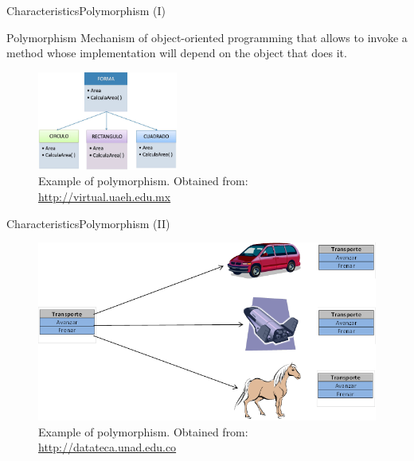 \documentclass[10pt,compress]{beamer} %
\begin{document}
\begin{frame}{Characteristics}{Polymorphism (I)}
\vspace{-0.2cm}
	\begin{block}{Polymorphism}
		Mechanism of object-oriented programming that allows to invoke a method whose implementation will depend on the object that does it.
  	\end{block}	
	\begin{figure}
	  \vspace{-0.2cm}
		\includegraphics[width=4.6cm]{figs/polimorfismo1}
		\vspace{-0.2cm}
		\caption{\scriptsize{Example of polymorphism. Obtained from: \url{http://virtual.uaeh.edu.mx}}}
	\end{figure}
\end{frame}

\begin{frame}{Characteristics}{Polymorphism (II)}
	\begin{figure}
		\includegraphics[scale=0.57]{figs/polimorfismo2}
		\vspace{-0.1cm}
		\caption{{\scriptsize Example of polymorphism. Obtained from: \url{http://datateca.unad.edu.co}}}
	\end{figure}
\end{frame}
\end{document}
